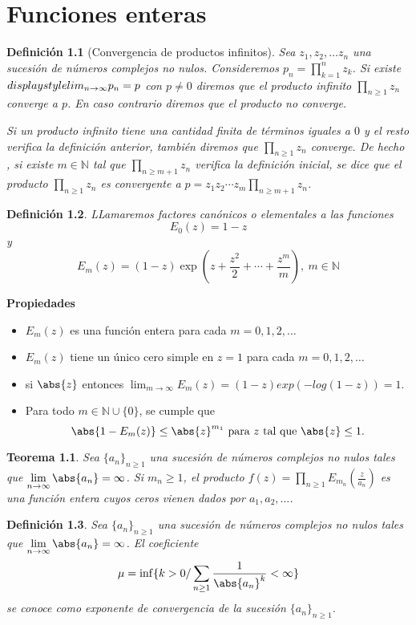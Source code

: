 \documentclass[12pt]{book}
\newtheorem{defi}{Definición}[chapter]
\newtheorem{theorem}{Teorema}[chapter]
\newcommand{\N}{\mathbb{N}}
\begin{document}
\chapter{Funciones enteras}
\begin{defi}[Convergencia de productos infinitos]
Sea $z_1,z_2,\ldots z_n$ una sucesión de números complejos no nulos. Consideremos $p_n =\prod_{k=1}^n z_k$. Si existe $\\displaystyle lim_{n\to \infty}p_n = p$ con $p\neq 0$ diremos que el producto infinito $\prod_{n\geq 1}z_n$ converge  a $p$. En caso contrario diremos que el producto no converge.

Si un producto infinito tiene una cantidad finita de términos iguales a $0$ y el resto verifica la definición anterior, también diremos que $\prod_{n\geq 1}z_n$ converge. De hecho , si existe $m\in \N$ tal que $\prod_{n\geq m+1}z_n$ verifica la definición inicial, se dice que el producto $\prod_{n\geq 1}z_n$ es convergente a $p = z_1z_2\cdots z_m\prod_{n\geq m+1}z_n$.
\end{defi}

\begin{defi}
LLamaremos factores canónicos o elementales a las funciones 
$$ E_0(z) = 1-z$$
y
$$E_m(z) = (1-z)\exp\left(z+\frac{z^2}{2}+\cdots + \frac{z^m}{m}\right),\ m\in\N$$
\end{defi}

\textbf{Propiedades}
\begin{itemize}
\item $E_m(z)$ es una función entera para cada $m = 0,1,2,\ldots$
\item $E_m(z)$ tiene un único cero simple en $z=1$ para cada   $m = 0,1,2,\ldots$
\item si $\abs{z}$ entonces $\displaystyle \lim_{m \to \infty} E_m(z) =(1-z) exp(-log(1-z))=1$.
\item Para todo $m\in \N \cup \{0\}$, se cumple que
$$\abs{1-E_m(z)} \leq \abs{z}^{m_1} \text{ para } z \text{ tal que } \abs{z}\leq 1.$$
\end{itemize}


\begin{theorem}
Sea $\{a_n\}_{n\geq 1}$ una sucesión de números complejos no nulos tales que $\displaystyle\lim_{n\to \infty} \abs{a_n} = \infty$. Si $m_n \geq 1$, el producto $f(z) = \prod_{n\geq1}E_{m_n}\left(\frac{z}{a_n}\right)$ es una función entera cuyos ceros vienen dados por $a_1,a_2,\ldots$.
\end{theorem}

\begin{defi}
Sea $\{a_n\}_{n\geq 1}$ una sucesión de números complejos no nulos tales que $\displaystyle\lim_{n\to \infty} \abs{a_n} = \infty$. El coeficiente
$$\mu = \inf\{k>0 / \sum_{n\geq 1}\frac{1}{\abs{a_n}^k} < \infty\}$$
se conoce como \textit{exponente de convergencia} de la sucesión $\{a_n\}_{n\geq 1}$.
\end{defi}
\end{document}
